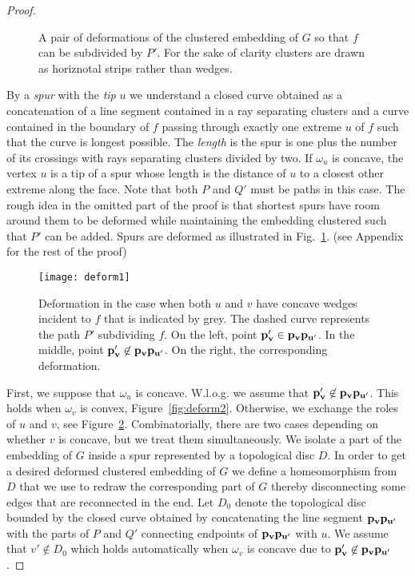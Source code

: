 \documentclass{llncs}
\newif\iflong
\begin{document}
\begin{proof}
\begin{figure}[h]
\caption{A pair of deformations of the clustered embedding of $G$ so that $f$ can be subdivided by $P'$. For the sake of clarity clusters are drawn as horiznotal strips rather than wedges.}
 \label{fig:stork}
\end{figure}


By a \emph{spur} with the \emph{tip} $u$ we understand a closed curve  obtained  as  a concatenation of a line segment contained in a ray separating clusters
and a curve contained in the boundary of $f$ passing through exactly one extreme $u$
of $f$ such that the curve is longest possible. The \emph{length} is the spur
is one plus the number of its crossings with rays separating clusters divided by two.
 If $\omega_u$ is concave, the vertex $u$ is a tip of a spur whose length is the distance of $u$ to a closest other extreme along the face. Note that both $P$ and $Q'$ must be paths in this case.
The rough idea in the omitted part of the proof is that shortest spurs have room around them to be deformed while maintaining the embedding
clustered such that $P'$ can be added.
Spurs  are deformed  as illustrated in Fig.~\ref{fig:stork}. (see Appendix for the rest of the proof)
\iflong


 \begin{figure}[h]
  \centering
\centering
{
\texttt{[image: deform1]}
    	}

\caption{Deformation in the case when both $u$ and $v$ have concave wedges incident to $f$ that is indicated by grey.
The dashed curve represents the path $P'$ subdividing $f$.
On the left,  point ${\bf p_v'}\in{\bf p_{v}p_{u'}}$. In the middle, 
   point ${\bf p_v'}\not\in{\bf p_{v}p_{u'}}$. On the right, the corresponding
 deformation.}
\label{fig:deform1}
\end{figure}


 First, we suppose that $\omega_u$ is concave.
 W.l.o.g. we assume that ${\bf p_{v}'}\not\in{\bf p_{v}p_{u'}}$. This holds when $\omega_v$ is convex,
 Figure~\ref{fig:deform2}. Otherwise,
we exchange the roles of $u$ and $v$, see Figure~\ref{fig:deform1}. Combinatorially, there are two
cases depending on whether $v$ is concave, but we treat them
simultaneously.
We isolate a part of the embedding of $G$ inside a spur represented
by a topological disc $D$. In order to get a desired deformed clustered embedding of $G$ we define a homeomorphism from $D$ that we use to redraw the corresponding part of $G$  thereby disconnecting some edges
that are reconnected in the end.
 Let $D_0$ denote the topological disc bounded by the closed curve
obtained by concatenating the line segment ${\bf p_{v}}{\bf p_{u'}}$ with the parts
of $P$ and $Q'$ connecting endpoints of ${\bf p_{v}}{\bf p_{u'}}$  with $u$. 
We assume that $v'\not\in D_0$ which holds automatically when $\omega_v$ is concave due to ${\bf p_{v}'}\not\in{\bf p_{v}p_{u'}}$. 


\end{proof}
\end{document}
